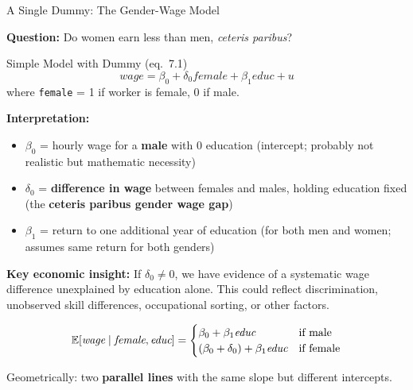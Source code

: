 \documentclass[aspectratio=169, 12pt]{beamer}
\begin{document}
\begin{frame}[shrink=25]{A Single Dummy: The Gender-Wage Model}

  \textbf{Question:} Do women earn less than men, \textit{ceteris paribus}?

  \medskip

  \begin{definitionbox}{Simple Model with Dummy (eq.\ 7.1)}
    \[
      \textit{wage} = \beta_0 + \delta_0 \textit{female} + \beta_1 \textit{educ} + u
    \]
    where \texttt{female} = 1 if worker is female, 0 if male.
  \end{definitionbox}

  \medskip

  \textbf{Interpretation:}

  \begin{itemize}
    \item $\beta_0$ = hourly wage for a \textbf{male} with 0 education (intercept; probably not realistic but mathematic necessity)
    \item $\delta_0$ = \textbf{difference in wage} between females and males, holding education fixed (the \textbf{ceteris paribus gender wage gap})
    \item $\beta_1$ = return to one additional year of education (for both men and women; assumes same return for both genders)
  \end{itemize}

  \medskip

  \textbf{Key economic insight:} If $\delta_0 \neq 0$, we have evidence of a systematic wage difference unexplained by education alone. This could reflect discrimination, unobserved skill differences, occupational sorting, or other factors.

  \medskip

  \begin{highlightbox}
    \[
      \operatorname{\mathbb{E}}[\textit{wage} \mid \textit{female}, \textit{educ}] =
      \begin{cases}
        \beta_0 + \beta_1 \textit{educ} & \text{if male} \\
        (\beta_0 + \delta_0) + \beta_1 \textit{educ} & \text{if female}
      \end{cases}
    \]

    Geometrically: two \textbf{parallel lines} with the same slope but different intercepts.
  \end{highlightbox}

\end{frame}
\end{document}
